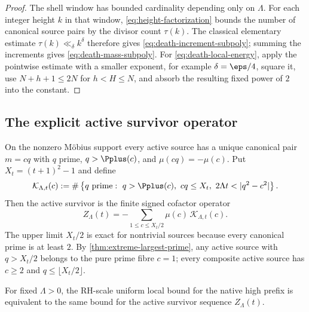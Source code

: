\begin{proof}
The shell window has bounded cardinality depending only on $\Lambda$.  For each integer height $k$ in that window, \cref{eq:height-factorization} bounds the number of canonical source pairs by the divisor count $\tau(k)$.  The classical elementary estimate $\tau(k)\ll_\delta k^\delta$ therefore gives \cref{eq:death-increment-subpoly}; summing the increments gives \cref{eq:death-mass-subpoly}.  For \cref{eq:death-local-energy}, apply the pointwise estimate with a smaller exponent, for example $\delta=\eps/4$, square it, use $N+h+1\le2N$ for $h<H\le N$, and absorb the resulting fixed power of $2$ into the constant.
\end{proof}

\subsection{The explicit active survivor operator}

On the nonzero M\"obius support every active source has a unique canonical pair $m=cq$ with $q$ prime, $q>\Pplus(c)$, and $\mu(cq)=-\mu(c)$.  Put $X_t=(t+1)^2-1$ and define
\begin{equation}
 \mathcal K_{\Lambda,t}(c)
 :=\#\left\{
 q\text{ prime}:\
 q>\Pplus(c),\ cq\le X_t,\ 2\Lambda t<|q^2-c^2|
 \right\}.
 \label{eq:survivor-kernel}
\end{equation}
Then the active survivor is the finite signed cofactor operator
\begin{equation}
 \boxed{
 Z_\Lambda(t)
 =-\sum_{1\le c\le X_t/2}\mu(c)\,\mathcal K_{\Lambda,t}(c).
 }
 \label{eq:survivor-zero-mode}
\end{equation}
The upper limit $X_t/2$ is exact for nontrivial sources because every canonical prime is at least $2$.  By \cref{thm:extreme-largest-prime}, any active source with $q>X_t/2$ belongs to the pure prime fibre $c=1$; every composite active source has $c\ge2$ and $q\le\lfloor X_t/2\rfloor$.

\begin{corollary}
\label{cor:death-removal}
For fixed $\Lambda>0$, the RH-scale uniform local bound for the native high prefix is equivalent to the same bound for the active survivor sequence $Z_\Lambda(t)$.
\end{corollary}

